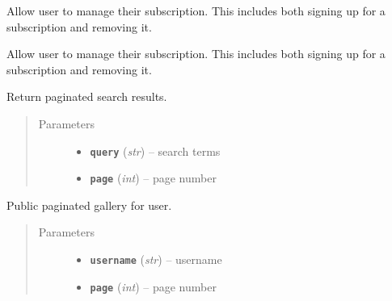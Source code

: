\documentclass[letterpaper,10pt,english]{sphinxmanual}
\begin{document}
\begin{fulllineitems}
\label{users:get--user-pro}
Allow user to manage their subscription. This includes both signing up for a subscription and removing it.

\end{fulllineitems}



\begin{fulllineitems}
\label{users:post--user-pro}
Allow user to manage their subscription. This includes both signing up for a subscription and removing it.

\end{fulllineitems}



\begin{fulllineitems}
\label{users:get--user-search_results-(query)-(int-page)}
Return paginated search results.
\begin{quote}\begin{description}
\item[{Parameters}] \leavevmode\begin{itemize}
\item {} 
\textbf{\texttt{query}} (\emph{str}) -- search terms

\item {} 
\textbf{\texttt{page}} (\emph{int}) -- page number

\end{itemize}

\end{description}\end{quote}

\end{fulllineitems}



\begin{fulllineitems}
\label{users:get--user-(username)-gallery-(int-page)}
Public paginated gallery for user.
\begin{quote}\begin{description}
\item[{Parameters}] \leavevmode\begin{itemize}
\item {} 
\textbf{\texttt{username}} (\emph{str}) -- username

\item {} 
\textbf{\texttt{page}} (\emph{int}) -- page number

\end{itemize}

\end{description}\end{quote}

\end{fulllineitems}
\end{document}

